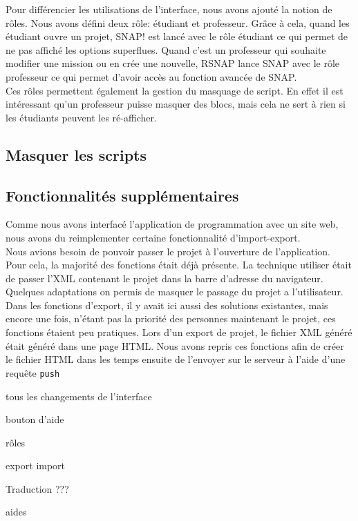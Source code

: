 Pour différencier les utilisations de l'interface, nous avons ajouté la notion de rôles. Nous avons défini deux rôle: étudiant et professeur. Grâce à cela, quand les étudiant ouvre un projet, SNAP! est lancé avec le rôle étudiant ce qui permet de ne pas affiché les options superflues. Quand c'est un professeur qui souhaite modifier une mission ou en crée une nouvelle, RSNAP lance SNAP avec le rôle professeur ce qui permet d'avoir accès au fonction avancée de SNAP.\\

Ces rôles permettent également la gestion du masquage de script. En effet il est intéressant qu'un professeur puisse masquer des blocs, mais cela ne sert à rien si les étudiants peuvent les ré-afficher.

\subsection{Masquer les scripts}

\subsection{Fonctionnalités supplémentaires}
Comme nous avons interfacé l'application de programmation avec un site web, nous avons du reimplementer certaine fonctionnalité d'import-export.\\

Nous avions besoin de pouvoir passer le projet à l'ouverture de l'application. Pour cela, la majorité des fonctions était déjà présente. La technique utiliser était de passer l'XML contenant le projet dans la barre d'adresse du navigateur. Quelques adaptations on permis de masquer le passage du projet a l'utilisateur.\\

Dans les fonctions d'export, il y avait ici aussi des solutions existantes, mais encore une fois, n'étant pas la priorité des personnes maintenant le projet, ces fonctions étaient peu pratiques. Lors d'un export de projet, le fichier XML généré était généré dans une page HTML. Nous avons repris ces fonctions afin de créer le fichier HTML dans les temps ensuite de l'envoyer sur le serveur à l'aide d'une requête \texttt{push}

tous les changements de l'interface

bouton d'aide

rôles

export import

Traduction ???

aides
